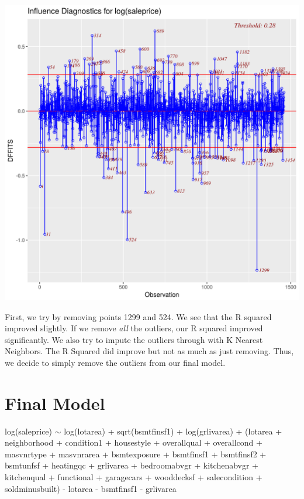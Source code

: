 \documentclass[12pt]{article}
\begin{document}
\begin{flushleft}
\begin{flushleft}
\begin{flushleft}
\end{flushleft}

\centering
    \vspace*{0.5 cm}
    \includegraphics[scale = .35]{outlier.png}\\[1.0 cm]	

\begin{flushleft}

First, we try by removing points 1299 and 524. We see that the R squared improved slightly. If we remove \textit{all} the outliers, our R squared improved significantly. We also try to impute the outliers through with K Nearest Neighbors. The R Squared did improve but not as much as just removing. Thus, we decide to simply remove the outliers from our final model.

\end{flushleft}

\section{Final Model}
\begin{flushleft}

log(saleprice) $\sim$ log(lotarea) + sqrt(bsmtfinsf1) + log(grlivarea) + 
    (lotarea + neighborhood + condition1 + housestyle + overallqual + 
        overallcond + masvnrtype + masvnrarea + bsmtexposure + 
        bsmtfinsf1 + bsmtfinsf2 + bsmtunfsf + heatingqc + grlivarea + 
        bedroomabvgr + kitchenabvgr + kitchenqual + functional + 
        garagecars + wooddecksf + salecondition + soldminusbuilt) - 
    lotarea - bsmtfinsf1 - grlivarea


\end{flushleft}
\end{flushleft}
\end{flushleft}
\end{document}
